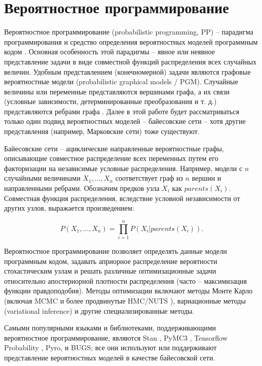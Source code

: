 \documentclass[a4paper,14pt]{extreport}
\begin{document}
\section{Вероятностное программирование}

\label{section:prob_prog}

Вероятностное программирование (probabilistic programming, PP) -- парадигма программирования и средство определения вероятностных моделей программным кодом \cite{intro_to_pp}. Основная особенность этой парадигмы – явное или неявное представление задачи в виде совместной функций распределения всех случайных величин. Удобным представлением (конечномерной) задачи являются графовые вероятностные модели 
(probabilistic graphical models / PGM). 
Случайные величины или переменные представляются вершинами графа, а их связи (условные зависимости, детерминированные преобразования и т. д.) представляются ребрами графа \cite{intro_to_pp}. Далее в этой работе будет рассматриваться только один подвид вероятностных моделей -- байесовские сети -- хотя другие представления (например, Марковские сети) тоже существуют.

Байесовские сети -- ациклические направленные вероятностные графы, описывающие совместное распределение всех переменных путем его факторизации на независимые условные распределения. Например, модели с $n$ случайными величинами $X_1, \dots, X_n$ соответствует граф из $n$ вершин и направленными ребрами. Обозначим предков узла $X_i$ как $\mathit{parents}(X_i)$. Совместная функция распределения, вследствие условной независимости от других узлов, выражается произведением:

\begin{equation}
	P(X_1, \dots, X_n) = \prod_{i=1}^{n}{P(X_i | \mathit{parents}(X_i))} .
\end{equation}

Вероятностное программирование позволяет определять данные модели программным кодом, задавать априорное распределение вероятности стохастическим узлам и решать различные оптимизационные задачи относительно апостериорной плотности распределения (часто -- максимизация функции правдоподобия). Методы оптимизации включают методы Монте Карло (включая MCMC и более продвинутые HMC/NUTS \cite{nuts_hoffman_gelman}), вариационные методы (variational inference) и другие специализированные методы.

Самыми популярными языками и библиотеками, поддерживающими вероятностное программирование, являются
Stan \cite{stan_overview}, PyMC3 \cite{pymc3_2016}, Tensorflow Probability \cite{tfp_distributions}, Pyro,
и BUGS; 
все они используют или поддерживают представление вероятностных моделей в качестве байесовской сети.
\end{document}
